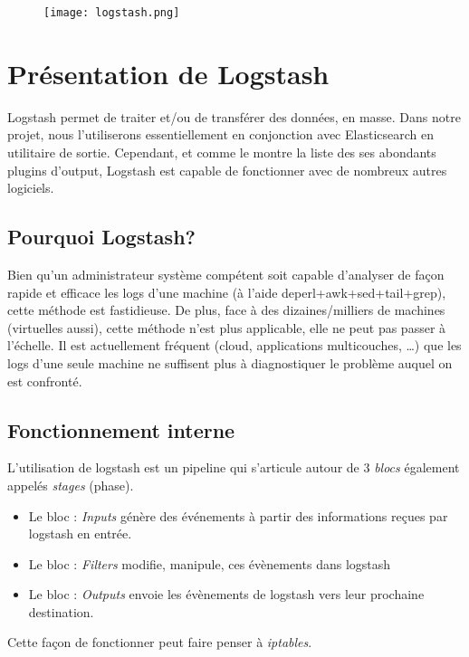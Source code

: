 \begin{figure}[H]
\center
\texttt{[image: logstash.png]}
\label{fig:logstashlogo.png}
\end{figure}
\section{Présentation de Logstash}

Logstash permet de traiter et/ou de transférer des données, en masse. Dans notre 
projet, nous l'utiliserons essentiellement en conjonction avec Elasticsearch en 
utilitaire de sortie. Cependant,
et comme le montre la liste des ses abondants plugins d'output, Logstash est capable
de fonctionner avec de nombreux autres logiciels.

\subsection{Pourquoi Logstash?}
Bien qu'un administrateur système compétent soit capable d'analyser de façon rapide 
et efficace les logs d'une machine (à l'aide deperl+awk+sed+tail+grep), cette méthode
est fastidieuse. De plus, face à des dizaines/milliers de machines (virtuelles aussi), 
cette méthode n'est plus applicable, elle ne peut pas passer à l'échelle.
Il est actuellement fréquent (cloud, applications multicouches, \ldots) que les logs 
d'une seule machine ne suffisent plus à diagnostiquer le problème auquel on est confronté.

\subsection{Fonctionnement interne}
L'utilisation de logstash est un pipeline qui s'articule autour de 3 \emph{blocs} 
également appelés \emph{stages} (phase).
\begin{itemize}
    \item   Le bloc : \emph{Inputs} génère des événements à partir des informations reçues
    par logstash en entrée.
    \item   Le bloc : \emph{Filters} modifie, manipule, ces évènements dans logstash
    \item   Le bloc : \emph{Outputs} envoie les évènements de logstash vers leur 
    prochaine destination.
\end{itemize}

Cette façon de fonctionner peut faire penser à \emph{iptables}.

